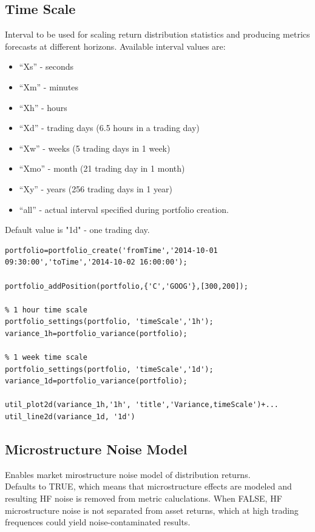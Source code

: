 \documentclass[letterpaper]{report}
\newcounter{N}
\begin{document}
\subsection{Time Scale}
Interval to be used for scaling return distribution statistics and producing metrics forecasts at different horizons. Available interval values are: 
\begin{itemize} 
  \item ``Xs'' - seconds
  \item ``Xm'' - minutes
  \item ``Xh'' - hours
  \item ``Xd'' - trading days (6.5 hours in a trading day)
  \item ``Xw'' - weeks (5 trading days in 1 week)
  \item ``Xmo'' - month (21 trading day in 1 month)
  \item ``Xy'' - years (256 trading days in 1 year)
  \item ``all'' - actual interval specified during portfolio creation.
\end{itemize}
Default value is "1d" - one trading day.
\begin{lstlisting}
portfolio=portfolio_create('fromTime','2014-10-01 09:30:00','toTime','2014-10-02 16:00:00');

portfolio_addPosition(portfolio,{'C','GOOG'},[300,200]);

% 1 hour time scale 
portfolio_settings(portfolio, 'timeScale','1h');
variance_1h=portfolio_variance(portfolio);

% 1 week time scale
portfolio_settings(portfolio, 'timeScale','1d');
variance_1d=portfolio_variance(portfolio);

util_plot2d(variance_1h,'1h', 'title','Variance,timeScale')+...
util_line2d(variance_1d, '1d')
\end{lstlisting}

\subsection{Microstructure Noise Model}
Enables market mirostructure noise model of distribution returns.\\
Defaults to TRUE, which means that microstructure effects are modeled and resulting HF noise is removed from metric caluclations. 
When FALSE, HF microstructure noise is not separated from asset returns, which at high trading frequences could yield noise-contaminated results.
\end{document}
